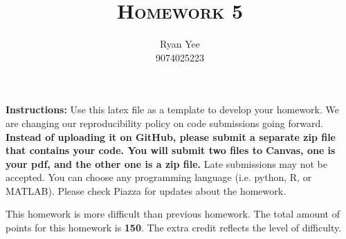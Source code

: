 \documentclass[a4paper]{article}
\title{\textsc{Homework 5}} %
\author{
Ryan Yee \\
9074025223\\
}
\date{}
\theoremstyle{definition}
\begin{document}
\maketitle 


\textbf{Instructions:}
Use this latex file as a template to develop your homework. We are changing our reproducibility policy on code submissions going forward. \textbf{Instead of uploading it on GitHub, please submit a separate zip file that contains your code. You will submit two files to Canvas, one is your pdf, and the other one is a zip file.} Late submissions may not be accepted. You can choose any programming language (i.e. python, R, or MATLAB). Please check Piazza for updates about the homework.
\vspace{0.1in}

This homework is more difficult than previous homework. The total amount of points for this homework is \textbf{150}. The extra credit reflects the level of difficulty.

\vspace{0.1in}





\end{document}
